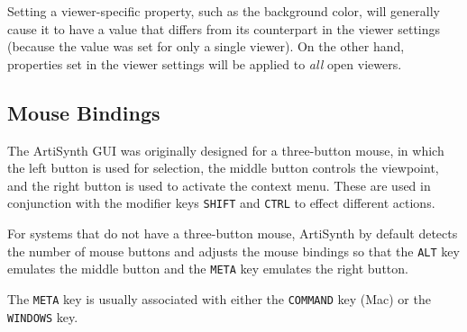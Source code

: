 \documentclass{article}
\begin{document}
\begin{sideblock}
Setting a viewer-specific property, such as the background color, will
generally cause it to have a value that differs from its counterpart
in the viewer settings (because the value was set for only a single
viewer). On the other hand, properties set in the viewer settings will
be applied to {\it all} open viewers.
\end{sideblock}

\subsection{Mouse Bindings}
\label{MouseBindingsSec}

The ArtiSynth GUI was originally designed for a three-button mouse, in
which the left button is used for selection, the middle button
controls the viewpoint, and the right button is used to activate the
context menu. These are used in conjunction with the modifier keys
{\tt SHIFT} and {\tt CTRL} to effect different actions.

For systems that do not have a three-button mouse, ArtiSynth by
default detects the number of mouse buttons and adjusts the mouse
bindings so that the {\tt ALT} key emulates the middle button and the
{\tt META} key emulates the right button.

\begin{sideblock}
The {\tt META} key is usually associated with either the {\tt COMMAND}
key (Mac) or the {\tt WINDOWS} key.
\end{sideblock}
\end{document}
